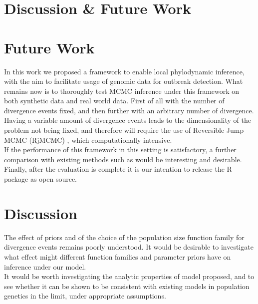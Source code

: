 \documentclass{ieeeaccess}
\theoremstyle{definition}
\begin{document}
\section{Discussion \& Future Work}
\section{Future Work}
In this work we proposed a framework to enable local phylodynamic inference, with the aim to facilitate usage of genomic data for outbreak detection. What remains now is to thoroughly test MCMC inference under this framework on both synthetic data and real world data. First of all with the number of divergence events fixed, and then further with an arbitrary number of divergence.\\
Having a variable amount of divergence events leads to the dimensionality of the problem not being fixed, and therefore will require the use of Reversible Jump MCMC (RjMCMC) \cite{green_reversible_1995, fan_reversible_2010}, which computationally intensive.\\
If the performance of this framework in this setting is satisfactory, a further comparison with existing methods such as \cite{volz_identification_nodate,barido-sottani_multitype_2020} would be interesting and desirable.\\
Finally, after the evaluation is complete it is our intention to release the R package as open source.
\section{Discussion}
The effect of priors and of the choice of the population size function family for divergence events remains poorly understood. It would be desirable to investigate what effect might different function families and parameter priors have on inference under our model.\\
It would be worth investigating the analytic properties of model proposed, and to see whether it can be shown to be consistent with existing models in population genetics in the limit, under appropriate assumptions.
\begin{thebibliography}{00}
\printbibliography
\end{thebibliography}
\EOD
\end{document}
